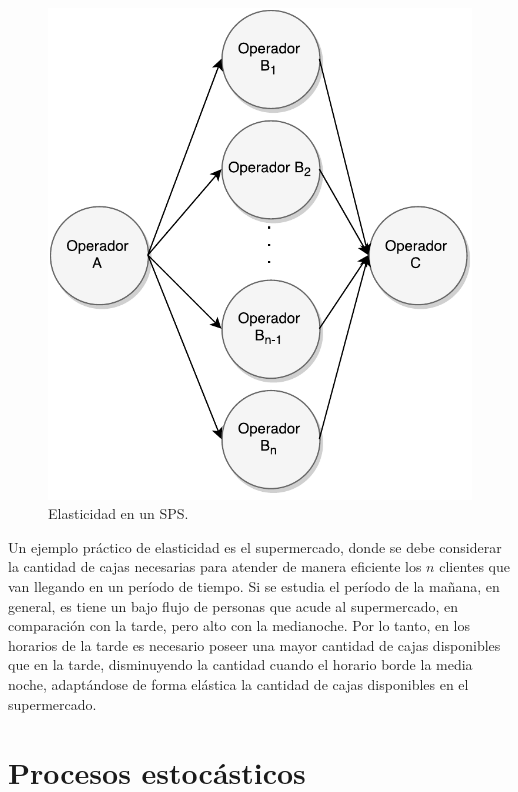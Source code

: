 \begin{figure}[!ht]
	\centering
	\includegraphics[scale=0.55]{images/Elasticidad.pdf}
	\caption{Elasticidad en un SPS.}
	\label{fig:elasticidad}
\end{figure}

Un ejemplo práctico de elasticidad es el supermercado, donde se debe considerar la cantidad de cajas necesarias para atender de manera eficiente los $n$ clientes que van llegando en un período de tiempo. Si se estudia el período de la mañana, en general, es tiene un bajo flujo de personas que acude al supermercado, en comparación con la tarde, pero alto con la medianoche. Por lo tanto, en los horarios de la tarde es necesario poseer una mayor cantidad de cajas disponibles que en la tarde, disminuyendo la cantidad cuando el horario borde la media noche, adaptándose de forma elástica la cantidad de cajas disponibles en el supermercado.

\section{Procesos estocásticos}
\label{sec:procesosEstocasticos}

